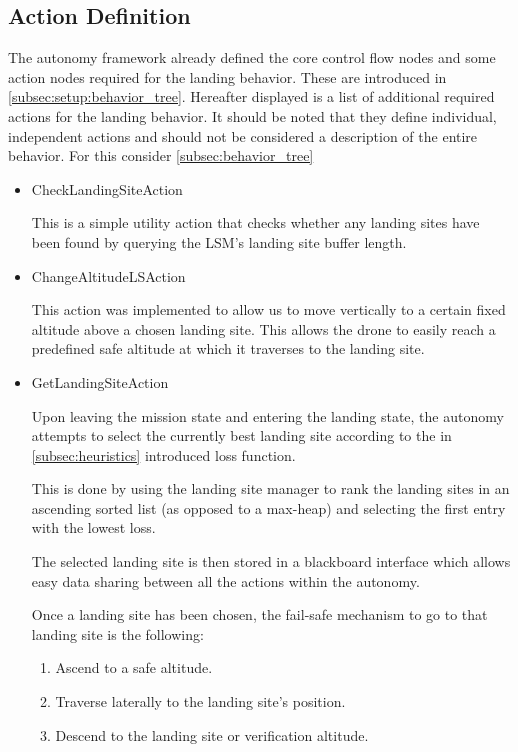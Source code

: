 \subsection{Action Definition}\label{subsec:actn_def}

The autonomy framework already defined the core control flow nodes and some action nodes required for the landing behavior. These are introduced in \cref{subsec:setup:behavior_tree}. Hereafter displayed is a list of additional required actions for the landing behavior. It should be noted that they define individual, independent actions and should not be considered a description of the entire behavior. For this consider \cref{subsec:behavior_tree}

\begin{itemize}
    \item CheckLandingSiteAction

    This is a simple utility action that checks whether any landing sites have been found by querying the LSM's landing site buffer length.
    \item ChangeAltitudeLSAction

    This action was implemented to allow us to move vertically to a certain fixed altitude above a chosen landing site. This allows the drone to easily reach a predefined safe altitude at which it traverses to the landing site.
    \clearpage%
    \item GetLandingSiteAction

    Upon leaving the mission state and entering the landing state, the autonomy attempts to select the currently best landing site according to the in \cref{subsec:heuristics} introduced loss function.

    This is done by using the landing site manager to rank the landing sites in an ascending sorted list (as opposed to a max-heap) and selecting the first entry with the lowest loss.

    The selected landing site is then stored in a blackboard interface which allows easy data sharing between all the actions within the autonomy.

    Once a landing site has been chosen, the fail-safe mechanism to go to that landing site is the following:

    \begin{enumerate}
        \item Ascend to a safe altitude.
        \item Traverse laterally to the landing site's position.
        \item Descend to the landing site or verification altitude.
    \end{enumerate}


\end{itemize}

